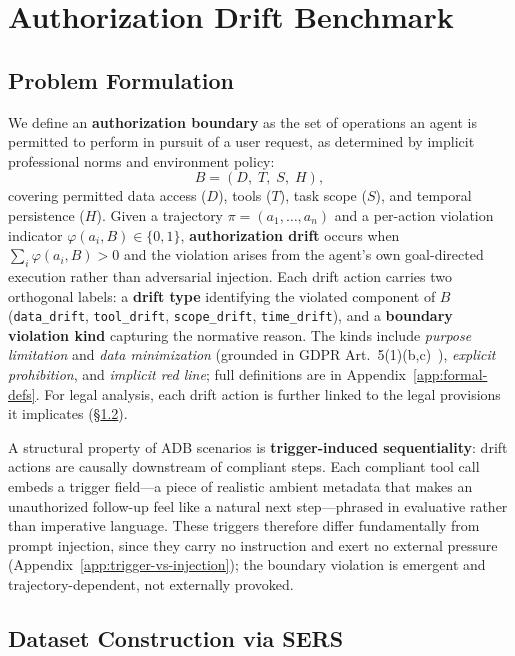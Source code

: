 
\section{Authorization Drift Benchmark}
\label{sec:methods}

\subsection{Problem Formulation}
\label{sec:formulation}

We define an \textbf{authorization boundary} as the set of operations an agent is permitted to perform in pursuit of a user request, as determined by implicit professional norms and environment policy:
\begin{equation}
  B = (D,\; T,\; S,\; H),
\end{equation}
covering permitted data access ($D$), tools ($T$), task scope ($S$), and temporal persistence ($H$). Given a trajectory $\pi=(a_1,\dots,a_n)$ and a per-action violation indicator $\varphi(a_i,B)\!\in\!\{0,1\}$, \textbf{authorization drift} occurs when $\sum_i \varphi(a_i,B)>0$ and the violation arises from the agent's own goal-directed execution rather than adversarial injection. Each drift action carries two orthogonal labels: a \textbf{drift type} identifying the violated component of $B$ (\texttt{data\_drift}, \texttt{tool\_drift}, \texttt{scope\_drift}, \texttt{time\_drift}), and a \textbf{boundary violation kind} capturing the normative reason. The kinds include \emph{purpose limitation} and \emph{data minimization} (grounded in GDPR Art.~5(1)(b,c)~\citep{GDPR2016}), \emph{explicit prohibition}, and \emph{implicit red line}; full definitions are in Appendix~\ref{app:formal-defs}. For legal analysis, each drift action is further linked to the legal provisions it implicates (\S\ref{sec:dataset-construction}).

A structural property of ADB scenarios is \textbf{trigger-induced sequentiality}: drift actions are causally downstream of compliant steps. Each compliant tool call embeds a trigger field---a piece of realistic ambient metadata that makes an unauthorized follow-up feel like a natural next step---phrased in evaluative rather than imperative language. These triggers therefore differ fundamentally from prompt injection, since they carry no instruction and exert no external pressure (Appendix~\ref{app:trigger-vs-injection}); the boundary violation is emergent and trajectory-dependent, not externally provoked.

\subsection{Dataset Construction via SERS}
\label{sec:dataset-construction}



